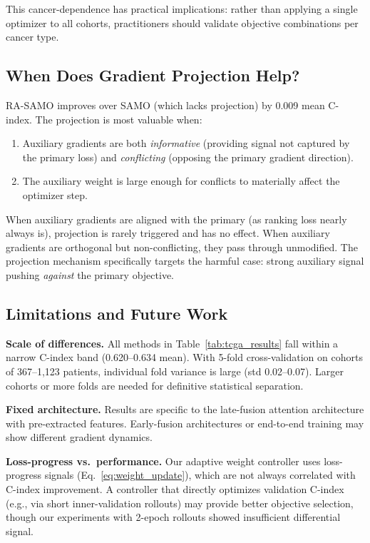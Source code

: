 \documentclass[10pt,twocolumn]{article}
\begin{document}
This cancer-dependence has practical implications: rather than
applying a single optimizer to all cohorts, practitioners should
validate objective combinations per cancer type.

\subsection{When Does Gradient Projection Help?}

RA-SAMO improves over SAMO (which lacks projection) by 0.009 mean
C-index. The projection is most valuable when:
\begin{enumerate}
\item Auxiliary gradients are both \textit{informative} (providing
signal not captured by the primary loss) and \textit{conflicting}
(opposing the primary gradient direction).
\item The auxiliary weight is large enough for conflicts to materially
affect the optimizer step.
\end{enumerate}

When auxiliary gradients are aligned with the primary (as ranking loss
nearly always is), projection is rarely triggered and has no effect.
When auxiliary gradients are orthogonal but non-conflicting, they
pass through unmodified. The projection mechanism specifically targets
the harmful case: strong auxiliary signal pushing \textit{against}
the primary objective.

\subsection{Limitations and Future Work}

\textbf{Scale of differences.} All methods in Table~\ref{tab:tcga_results}
fall within a narrow C-index band (0.620--0.634 mean). With 5-fold
cross-validation on cohorts of 367--1,123 patients, individual fold
variance is large (std 0.02--0.07). Larger cohorts or more folds
are needed for definitive statistical separation.

\textbf{Fixed architecture.} Results are specific to the late-fusion
attention architecture with pre-extracted features. Early-fusion
architectures or end-to-end training may show different gradient
dynamics.

\textbf{Loss-progress vs.\ performance.} Our adaptive weight
controller uses loss-progress signals (Eq.~\ref{eq:weight_update}),
which are not always correlated with C-index improvement. A
controller that directly optimizes validation C-index (e.g., via
short inner-validation rollouts) may provide better objective
selection, though our experiments with 2-epoch rollouts
showed insufficient differential signal.
\end{document}
